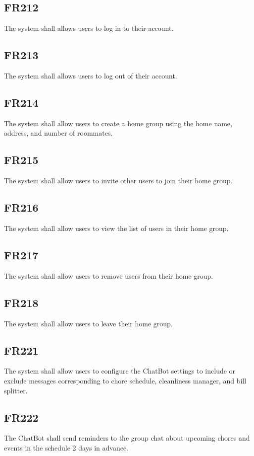 \documentclass[12pt, titlepage]{article}
\begin{document}
\subsection{FR212}
The system shall allows users to log in to their account.
\subsection{FR213}
The system shall allows users to log out of their account.
\subsection{FR214}
The system shall allow users to create a home group using the home name, address, and number of roommates.

\subsection{FR215}
The system shall allow users to invite other users to join their home group.

\subsection{FR216}
The system shall allow users to view the list of users in their home group.

\subsection{FR217}
The system shall allow users to remove users from their home
group.

\subsection{FR218}
The system shall allow users to leave their home group.

\subsection{FR221}
The system shall allow users to configure the ChatBot settings to
include or exclude messages corresponding to chore schedule, cleanliness
manager, and bill splitter.

\subsection{FR222}
The ChatBot shall send reminders to the group chat about
upcoming chores and events in the schedule 2 days in advance.
\end{document}
